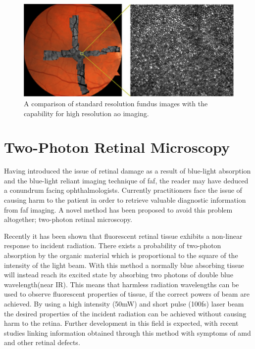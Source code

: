 \begin{figure}[H]
\centering
\includegraphics{figures/ao}
\caption{A comparison of standard resolution fundus images with the
              capability for high resolution \Gls{ao} imaging.\cite{zhang2006high}}
\label{fig:ao}
\end{figure}

\section{Two-Photon Retinal Microscopy}

Having introduced the issue of retinal damage as a result of blue-light
absorption and the blue-light reliant imaging technique of \Gls{faf}, the reader may have deduced a conundrum facing ophthalmologists. Currently
practitioners face the issue of causing harm to the patient in order to retrieve
valuable diagnostic information from \Gls{faf} imaging. A novel method has been proposed
to avoid this problem altogether; two-photon retinal microscopy.

Recently it has been shown that fluorescent retinal tissue exhibits a non-linear
response to incident radiation. \cite{denk1990two} There exists a probability of
two-photon absorption by the organic material which is proportional to the square
of the intensity of the light beam. With this method a normally blue absorbing
tissue will instead reach its excited state by absorbing two photons of double
blue wavelength(near IR). This means that harmless radiation wavelengths can be used to
observe fluorescent properties of tissue, if the correct powers of beam are
achieved. By using a high intensity (50mW) and short pulse (100fs) \Gls{laser}
beam the desired properties of the incident radiation can be achieved without causing
harm to the retina. Further development in this field is expected, with recent studies
linking information obtained through this method with symptoms of \Gls{amd}
and other retinal defects.\cite{palczewska2010noninvasive,palczewska2014noninvasive}

